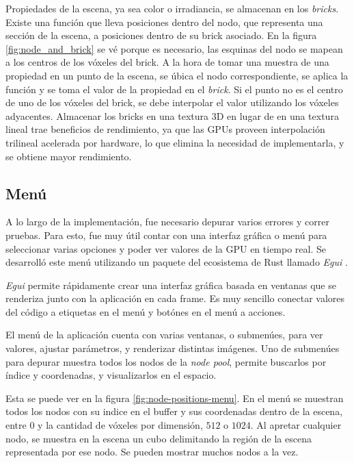 Propiedades de la escena, ya sea color o irradiancia, se almacenan en los \textit{bricks}.
Existe una función que lleva posiciones dentro del nodo, que representa una sección de la escena, a posiciones dentro de su brick asociado.
En la figura \ref{fig:node_and_brick} se vé porque es necesario, las esquinas del nodo se mapean a los centros de los vóxeles del brick.
A la hora de tomar una muestra de una propiedad en un punto de la escena, se úbica el nodo correspondiente, se aplica la función y se toma el valor de la propiedad en el \textit{brick}.
Si el punto no es el centro de uno de los vóxeles del brick, se debe interpolar el valor utilizando los vóxeles adyacentes.
Almacenar los bricks en una textura 3D en lugar de en una textura lineal trae beneficios de rendimiento, ya que las GPUs proveen interpolación trilineal acelerada por hardware, lo que elimina la necesidad de implementarla, y se obtiene mayor rendimiento.

\subsection{Menú}

A lo largo de la implementación, fue necesario depurar varios errores y correr pruebas.
Para esto, fue muy útil contar con una interfaz gráfica o menú para seleccionar varias opciones y poder ver valores de la GPU en tiempo real.
Se desarrolló este menú utilizando un paquete del ecosistema de Rust llamado \textit{Egui} \cite{egui}.

\textit{Egui} permite rápidamente crear una interfaz gráfica basada en ventanas que se renderiza junto con la aplicación en cada frame.
Es muy sencillo conectar valores del código a etiquetas en el menú y botónes en el menú a acciones.

El menú de la aplicación cuenta con varias ventanas, o submenúes, para ver valores, ajustar parámetros, y renderizar distintas imágenes.
Uno de submenúes para depurar muestra todos los nodos de la \textit{node pool}, permite buscarlos por índice y coordenadas, y visualizarlos en el espacio.

Esta se puede ver en la figura \ref{fig:node-positions-menu}.
En el menú se muestran todos los nodos con su indice en el buffer y sus coordenadas dentro de la escena, entre $0$ y la cantidad de vóxeles por dimensión, $512$ o $1024$.
Al apretar cualquier nodo, se muestra en la escena un cubo delimitando la región de la escena representada por ese nodo.
Se pueden mostrar muchos nodos a la vez.

